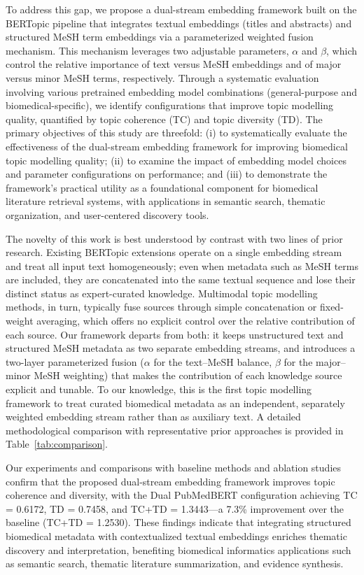 \documentclass[authorproof,JACIII,researchpaper]{fujipressarticle}
\begin{document}
{\color{red}To address this gap, we propose a dual-stream embedding framework built on the BERTopic pipeline that integrates textual embeddings (titles and abstracts) and structured MeSH term embeddings via a parameterized weighted fusion mechanism.} {\color{red}This mechanism leverages two adjustable parameters, $\alpha$ and $\beta$, which control the relative importance of text versus MeSH embeddings and of major versus minor MeSH terms, respectively.} {\color{red}Through a systematic evaluation involving various pretrained embedding model combinations (general-purpose and biomedical-specific), we identify configurations that improve topic modelling quality, quantified by topic coherence (TC) and topic diversity (TD).} {\color{red}The primary objectives of this study are threefold: (i) to systematically evaluate the effectiveness of the dual-stream embedding framework for improving biomedical topic modelling quality; (ii) to examine the impact of embedding model choices and parameter configurations on performance; and (iii) to demonstrate the framework's practical utility as a foundational component for biomedical literature retrieval systems, with applications in semantic search, thematic organization, and user-centered discovery tools.}

{\color{red}%
The novelty of this work is best understood by contrast with two lines of prior research. Existing BERTopic extensions operate on a single embedding stream and treat all input text homogeneously; even when metadata such as MeSH terms are included, they are concatenated into the same textual sequence and lose their distinct status as expert-curated knowledge. Multimodal topic modelling methods, in turn, typically fuse sources through simple concatenation or fixed-weight averaging, which offers no explicit control over the relative contribution of each source. Our framework departs from both: it keeps unstructured text and structured MeSH metadata as two separate embedding streams, and introduces a two-layer parameterized fusion ($\alpha$ for the text--MeSH balance, $\beta$ for the major--minor MeSH weighting) that makes the contribution of each knowledge source explicit and tunable. To our knowledge, this is the first topic modelling framework to treat curated biomedical metadata as an independent, separately weighted embedding stream rather than as auxiliary text. A detailed methodological comparison with representative prior approaches is provided in Table~\ref{tab:comparison}.
}%

{\color{red}%
Our experiments and comparisons with baseline methods and ablation studies confirm that the proposed dual-stream embedding framework improves topic coherence and diversity, with the Dual PubMedBERT configuration achieving TC = 0.6172, TD = 0.7458, and TC+TD = 1.3443---a 7.3\% improvement over the baseline (TC+TD = 1.2530). These findings indicate that integrating structured biomedical metadata with contextualized textual embeddings enriches thematic discovery and interpretation, benefiting biomedical informatics applications such as semantic search, thematic literature summarization, and evidence synthesis.
}%
\end{document}
